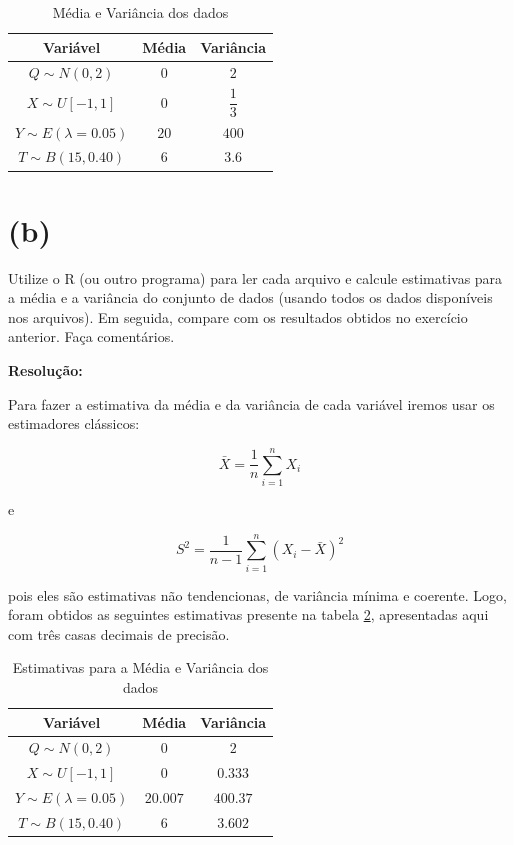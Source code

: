 \documentclass[]{abntex2}
\begin{document}
\begin{table}[H]
    \centering
    \begin{tabular}{|c|c|c|}
        \hline
        \textbf{Variável} & \textbf{Média} & \textbf{Variância} \\
        \hline
        $Q \sim N(0, 2)$ & $0$ & $2$ \\
        $X \sim U[-1, 1]$ & $0$ & $\dfrac{1}{3}$ \\
        $Y \sim E(\lambda = 0.05)$ & $20$ & $400$ \\
        $T \sim B(15, 0.40)$ & $6$ & $3.6$ \\
        \hline
    \end{tabular}
    \caption{Média e Variância dos dados}
    \label{tab:medvar}
\end{table}

\section*{\textbf{(b)}}

\noindent Utilize o R (ou outro programa) para ler cada arquivo e calcule estimativas para a
média e a variância do conjunto de dados (usando todos os dados disponíveis nos
arquivos). Em seguida, compare com os resultados obtidos no exercício anterior.
Faça comentários.

\textbf{Resolução:}

Para fazer a estimativa da média e da variância de cada variável iremos usar os estimadores clássicos:

\[
\bar{X} = \dfrac{1}{n} \sum_{i=1}^{n} X_i
\]

e

\[
S^2 = \dfrac{1}{n-1} \sum_{i=1}^{n} (X_i - \bar{X})^2
\]

pois eles são estimativas não tendencionas, de variância mínima e coerente. Logo, foram obtidos as seguintes estimativas presente na tabela \ref{tab:esti}, apresentadas aqui com três casas decimais de precisão.

\begin{table}[H]
    \centering
    \begin{tabular}{|c|c|c|}
        \hline
        \textbf{Variável} & \textbf{Média} & \textbf{Variância} \\
        \hline
        $Q \sim N(0, 2)$ & $ 0 $ & $2$ \\
        $X \sim U[-1, 1]$ & $0$ & $0.333$ \\
        $Y \sim E(\lambda = 0.05)$ & $20.007$ & $400.37$ \\
        $T \sim B(15, 0.40)$ & $6$ & $3.602$ \\
        \hline
    \end{tabular}
    \caption{Estimativas para a Média e Variância dos dados}
    \label{tab:esti}
\end{table}
\end{document}
